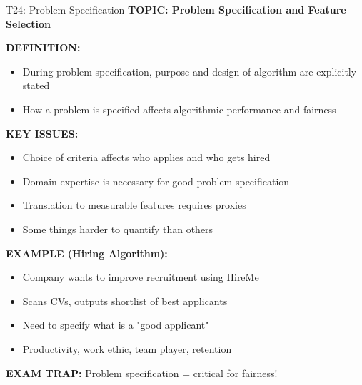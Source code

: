 \documentclass[8pt]{beamer}
\begin{document}
	\begin{frame}{T24: Problem Specification}
		\fontsize{6.5}{7.5}\selectfont
		\textbf{TOPIC: Problem Specification and Feature Selection}
		
		\vspace{0.1cm}
		\textbf{DEFINITION:}
		\begin{itemize}
			\item During problem specification, purpose and design of algorithm are explicitly stated
			\item How a problem is specified affects algorithmic performance and fairness
		\end{itemize}
		
		\vspace{0.1cm}
		\textbf{KEY ISSUES:}
		\begin{itemize}
			\item Choice of criteria affects who applies and who gets hired
			\item Domain expertise is necessary for good problem specification
			\item Translation to measurable features requires proxies
			\item Some things harder to quantify than others
		\end{itemize}
		
		\vspace{0.1cm}
		\textbf{EXAMPLE (Hiring Algorithm):}
		\begin{itemize}
			\item Company wants to improve recruitment using HireMe
			\item Scans CVs, outputs shortlist of best applicants
			\item Need to specify what is a "good applicant"
			\item Productivity, work ethic, team player, retention
		\end{itemize}
		
		\textcolor{myred}{\textbf{EXAM TRAP:}} Problem specification = \textcolor{myblue}{critical for fairness}!
	\end{frame}
	
\end{document}
